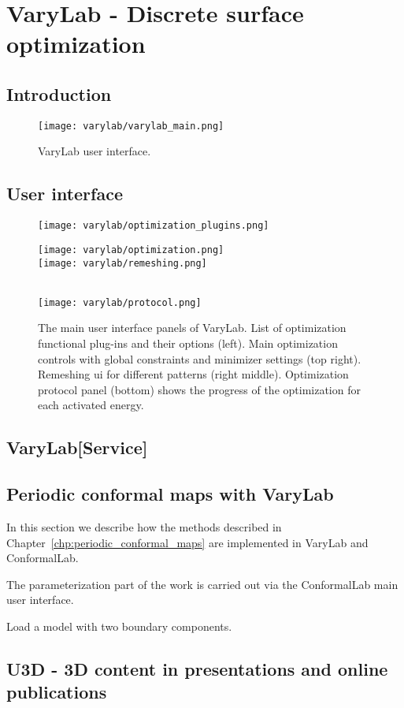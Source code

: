 \documentclass[Thesis.tex]{subfiles}
\begin{document}
\chapter{{\sc VaryLab} - Discrete surface optimization}
\label{chp:varylab}

\section{Introduction}



\begin{figure}
\begin{center}
\texttt{[image: varylab/varylab\_main.png]}
\caption{{\sc VaryLab} user interface.}
\label{fig:varylab_main_ui}
\end{center}
\end{figure}

\section{User interface}



\begin{figure}
\begin{center}
\texttt{[image: varylab/optimization\_plugins.png]}\hfill
\begin{minipage}[b]{0.47\linewidth}
\texttt{[image: varylab/optimization.png]}\\
\texttt{[image: varylab/remeshing.png]}
\end{minipage}\\
\vskip 0.05cm
\texttt{[image: varylab/protocol.png]}
\caption{The main user interface panels of {\sc VaryLab}. List of optimization functional plug-ins and their options (left). Main optimization controls with global constraints and minimizer settings (top right). Remeshing ui for different patterns (right middle). Optimization protocol panel (bottom) shows the progress of the optimization for each activated energy.}
\label{default}
\end{center}
\end{figure}



\section{{\sc VaryLab[Service]}}


\section{Periodic conformal maps with {\sc VaryLab}}
In this section we describe how the methods described in Chapter~\ref{chp:periodic_conformal_maps} are implemented in {\sc VaryLab} and {\sc ConformalLab}. 

The parameterization part of the work is carried out via the {\sc ConformalLab} main user interface. 

Load a model with two boundary components. 

\section{{\sc U3D} - 3D content in presentations and online publications}
\label{sec:u3d}

\subfilebibliography
\end{document}
